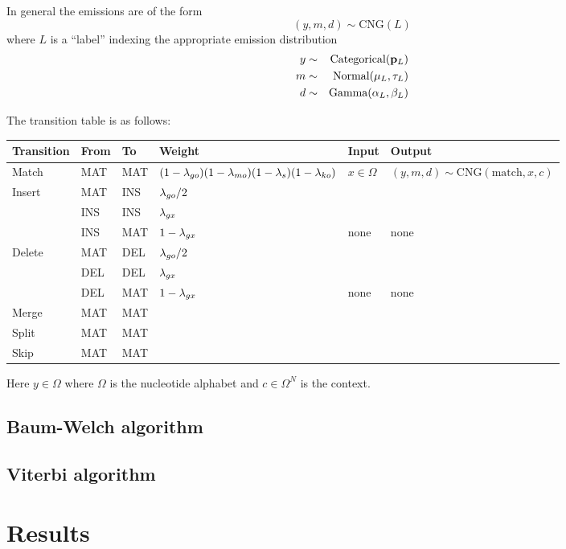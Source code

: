 \documentclass[10pt]{article}
\begin{document}
In general the emissions are of the form
\[
(y,m,d) \sim \mbox{CNG}(L)
\]
where $L$ is a ``label'' indexing the appropriate emission distribution
\begin{eqnarray*}
y & \sim & \mbox{Categorical}({\bf p}_L)
\\
m & \sim & \mbox{Normal}(\mu_L,\tau_L)
\\
d & \sim & \mbox{Gamma}(\alpha_L,\beta_L)
\end{eqnarray*}

The transition table is as follows:

\begin{tabular}{llllll}
Transition & From & To & Weight & Input & Output
\\
\hline
Match & MAT & MAT & $(1-\lambda_{go})(1-\lambda_{mo})(1-\lambda_s)(1-\lambda_{ko})$ & $x \in \Omega$ &
$(y,m,d) \sim \mbox{CNG}(\mbox{match},x,c)$
\\
Insert & MAT & INS & $\lambda_{go}/2$ \\
       & INS & INS & $\lambda_{gx}$ \\
       & INS & MAT & $1 - \lambda_{gx}$ & none & none \\
Delete & MAT & DEL & $\lambda_{go}/2$ \\
       & DEL & DEL & $\lambda_{gx}$ \\
       & DEL & MAT & $1 - \lambda_{gx}$ & none & none \\
Merge & MAT & MAT \\
Split & MAT & MAT \\
Skip & MAT & MAT \\
\end{tabular}

Here $y \in \Omega$ where $\Omega$ is the nucleotide alphabet
and $c \in \Omega^N$ is the context.



\subsection{Baum-Welch algorithm}

\subsection{Viterbi algorithm}



\newpage
\section{Results}
\end{document}
